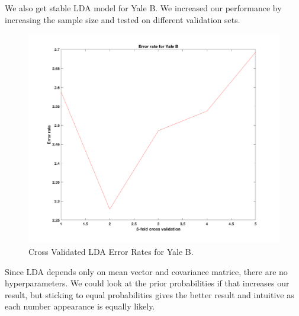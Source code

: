 We also get stable LDA model for Yale B. We increased our performance by increasing the sample size and tested on different validation sets. 
\begin{figure}[H]
	\centering\includegraphics[width=0.6\columnwidth]{../images/cr-err-yale}
	\caption{Cross Validated LDA Error Rates for Yale B.}
\end{figure}

Since LDA depends only on mean vector and covariance matrice, there are no hyperparameters. We could look at the prior probabilities if that increases our result, but sticking to equal probabilities gives the better result and intuitive as each number appearance is equally likely. 